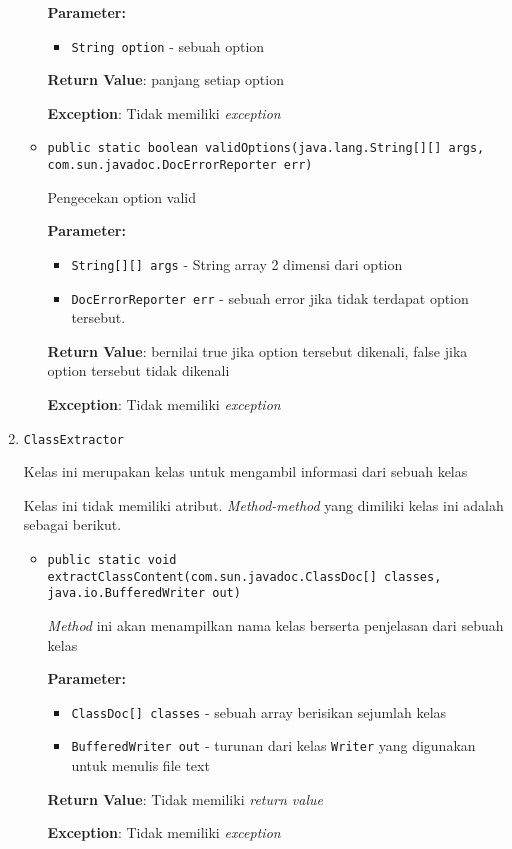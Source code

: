 \begin{enumerate}
\begin{itemize}
\textbf{Parameter:}
\begin{itemize}
\item \texttt{String option} - 
sebuah option
\end{itemize}
\textbf{Return Value}: panjang setiap option

\textbf{Exception}: Tidak memiliki \textit{exception}

\item \texttt{public static boolean validOptions(java.lang.String[][] args, com.sun.javadoc.DocErrorReporter err)}

Pengecekan option valid

\textbf{Parameter:}
\begin{itemize}
\item \texttt{String[][] args} - 
String array 2 dimensi dari option
\item \texttt{DocErrorReporter err} - 
sebuah error jika tidak terdapat option tersebut.
\end{itemize}
\textbf{Return Value}: bernilai true jika option tersebut dikenali, false jika option
 tersebut tidak dikenali

\textbf{Exception}: Tidak memiliki \textit{exception}

\end{itemize}
\item \texttt{ClassExtractor}

Kelas ini merupakan kelas untuk mengambil informasi dari sebuah kelas

Kelas ini tidak memiliki atribut. \textit{Method-method} yang dimiliki kelas ini adalah sebagai berikut.
\begin{itemize}
\item \texttt{public static void extractClassContent(com.sun.javadoc.ClassDoc[] classes, java.io.BufferedWriter out)}

\textit{Method} ini akan menampilkan nama kelas berserta penjelasan dari
 sebuah kelas

\textbf{Parameter:}
\begin{itemize}
\item \texttt{ClassDoc[] classes} - 
sebuah array berisikan sejumlah kelas
\item \texttt{BufferedWriter out} - 
turunan dari kelas \texttt{Writer} yang digunakan untuk menulis
                file text
\end{itemize}
\textbf{Return Value}: Tidak memiliki \textit{return value}

\textbf{Exception}: Tidak memiliki \textit{exception}


\end{itemize}
\end{enumerate}
